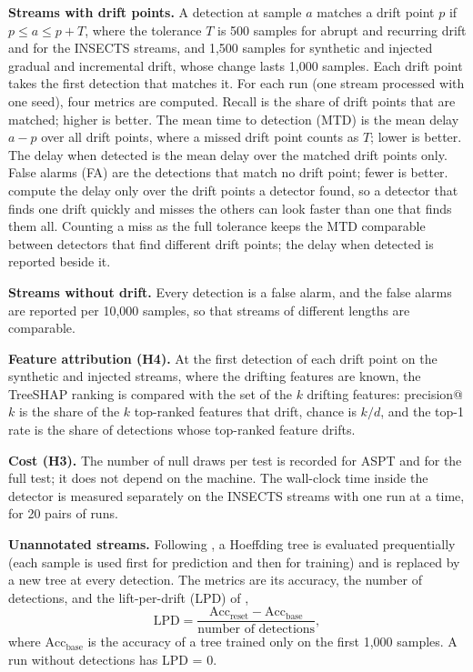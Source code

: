 \textbf{Streams with drift points.} A detection at sample $a$ matches a drift point $p$ if $p \leq a \leq p + T$, where the tolerance $T$ is 500 samples for abrupt and recurring drift and for the INSECTS streams, and 1,500 samples for synthetic and injected gradual and incremental drift, whose change lasts 1,000 samples. Each drift point takes the first detection that matches it. For each run (one stream processed with one seed), four metrics are computed. Recall is the share of drift points that are matched; higher is better. The mean time to detection (MTD) is the mean delay $a - p$ over all drift points, where a missed drift point counts as $T$; lower is better. The delay when detected is the mean delay over the matched drift points only. False alarms (FA) are the detections that match no drift point; fewer is better.
\citet{Lukats2024} compute the delay only over the drift points a detector found, so a detector that finds one drift quickly and misses the others can look faster than one that finds them all. Counting a miss as the full tolerance keeps the MTD comparable between detectors that find different drift points; the delay when detected is reported beside it.

\textbf{Streams without drift.} Every detection is a false alarm, and the false alarms are reported per 10,000 samples, so that streams of different lengths are comparable.

\textbf{Feature attribution (H4).} At the first detection of each drift point on the synthetic and injected streams, where the drifting features are known, the TreeSHAP ranking is compared with the set of the $k$ drifting features: precision@$k$ is the share of the $k$ top-ranked features that drift, chance is $k/d$, and the top-1 rate is the share of detections whose top-ranked feature drifts.

\textbf{Cost (H3).} The number of null draws per test is recorded for ASPT and for the full test; it does not depend on the machine. The wall-clock time inside the detector is measured separately on the INSECTS streams with one run at a time, for 20 pairs of runs.

\textbf{Unannotated streams.} Following \citet{Lukats2024}, a Hoeffding tree \citep{Domingos2000} is evaluated prequentially (each sample is used first for prediction and then for training) and is replaced by a new tree at every detection. The metrics are its accuracy, the number of detections, and the lift-per-drift (LPD) of \citet{Anderson2018},
\begin{equation}
\text{LPD} = \frac{\text{Acc}_{\text{reset}} - \text{Acc}_{\text{base}}}{\text{number of detections}},
\label{eq:lpd}
\end{equation}
where $\text{Acc}_{\text{base}}$ is the accuracy of a tree trained only on the first 1,000 samples. A run without detections has LPD = 0.

